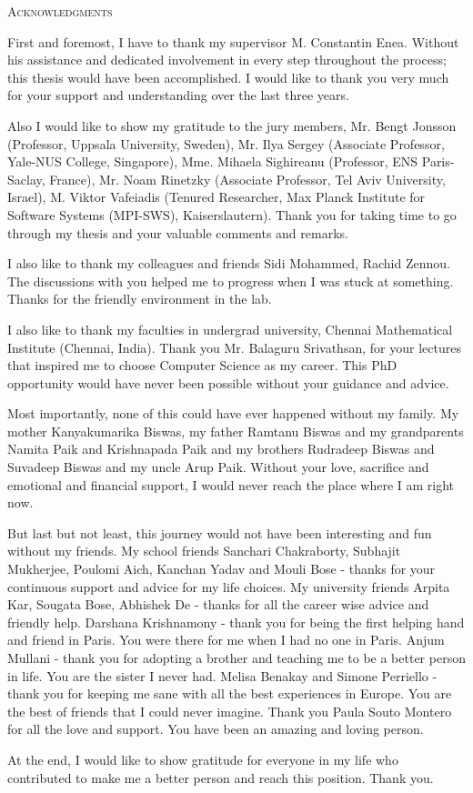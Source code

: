 \begin{center}
    \textsc{Acknowledgments}
  \end{center}
  \noindent

First and foremost, I have to thank my supervisor M. Constantin Enea. Without his assistance and dedicated involvement in every step throughout the process; this thesis would have been accomplished. I would like to thank you very much for your support and understanding over the last three years.

Also I would like to show my gratitude to the jury members, Mr. Bengt Jonsson (Professor, Uppsala University, Sweden), Mr. Ilya Sergey (Associate Professor, Yale-NUS College, Singapore), Mme. Mihaela Sighireanu (Professor, ENS Paris-Saclay, France), Mr. Noam Rinetzky (Associate Professor, Tel Aviv University, Israel), M. Viktor Vafeiadis (Tenured Researcher, Max Planck Institute for Software Systems (MPI-SWS), Kaiserslautern). Thank you for taking time to go through my thesis and your valuable comments and remarks.

I also like to thank my colleagues and friends Sidi Mohammed, Rachid Zennou. The discussions with you helped me to progress when I was stuck at something. Thanks for the friendly environment in the lab.

I also like to thank my faculties in undergrad university, Chennai Mathematical Institute (Chennai, India). Thank you Mr. Balaguru Srivathsan, for your lectures that inspired me to choose Computer Science as my career. This PhD opportunity would have never been possible without your guidance and advice.

Most importantly, none of this could have ever happened without my family. My mother Kanyakumarika Biswas, my father Ramtanu Biswas and my grandparents Namita Paik and Krishnapada Paik and my brothers Rudradeep Biswas and Suvadeep Biswas and my uncle Arup Paik. Without your love, sacrifice and emotional and financial support, I would never reach the place where I am right now.

But last but not least, this journey would not have been interesting and fun without my friends. My school friends Sanchari Chakraborty, Subhajit Mukherjee, Poulomi Aich, Kanchan Yadav and Mouli Bose - thanks for your continuous support and advice for my life choices. My university friends Arpita Kar, Sougata Bose, Abhishek De - thanks for all the career wise advice and friendly help. Darshana Krishnamony - thank you for being the first helping hand and friend in Paris. You were there for me when I had no one in Paris. Anjum Mullani - thank you for adopting a brother and teaching me to be a better person in life. You are the sister I never had. Melisa Benakay and Simone Perriello - thank you for keeping me sane with all the best experiences in Europe. You are the best of friends that I could never imagine. Thank you Paula Souto Montero for all the love and support. You have been an amazing and loving person.

At the end, I would like to show gratitude for everyone in my life who contributed to make me a better person and reach this position. Thank you.